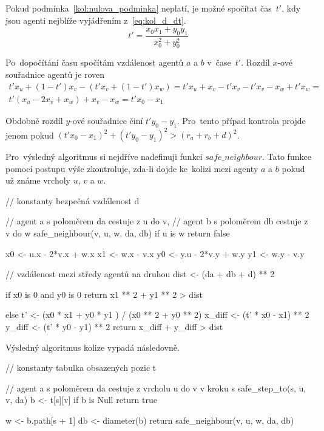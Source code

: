 Pokud podmínka~\ref{kol:nulova_podminka} neplatí, je možné spočítat čas~$t'$, kdy jsou agenti nejblíže vyjádřením z~\ref{eq:kol_d_dt}.
\begin{equation}
  \label{eq:kol_t}
  t' = \frac{x_0 x_1 + y_0 y_1}{x_0^2 + y_0^2}
\end{equation}

Po~dopočítání času spočítám vzdálenost agentů $a$ a $b$ v~čase~$t'$.
Rozdíl $x$-ové souřadnice agentů je roven
\begin{gather*}
  t' x_u + (1 - t')x_v - (t' x_v + (1 - t')x_w) =
  t' x_u + x_v - t' x_v - t' x_v - x_w + t' x_w = \\
  t'(x_u - 2x_v + x_w) + x_v - x_w =
  t' x_0 - x_1
\end{gather*}

Obdobně rozdíl $y$-ové souřadnice činí $t' y_0 - y_1$.
Pro~tento případ kontrola projde jenom pokud $(t' x_0 - x_1)^2 + (t' y_0 - y_1)^2 > (r_a + r_b + d)^2$.

Pro~výsledný algoritmus si nejdříve nadefinuji funkci $safe\_neighbour$.
Tato funkce pomocí postupu výše zkontroluje, zda-li dojde ke~kolizi mezi agenty $a$ a $b$
pokud už známe vrcholy $u$, $v$ a $w$.
\begin{code}
// konstanty bezpečná vzdálenost d

// agent a s poloměrem da cestuje z u do v,
// agent b s poloměrem db cestuje z v do w
safe_neighbour(v, u, w, da, db)
  if u is w return false

  x0 <- u.x - 2*v.x + w.x
  x1 <- w.x - v.x
  y0 <- y.u - 2*v.y + w.y
  y1 <- w.y - v.y

  // vzdálenost mezi středy agentů na druhou
  dist <- (da + db + d) ** 2

  if x0 is 0 and y0 is 0
    return x1 ** 2 + y1 ** 2 > dist

  else
    t' <- (x0 * x1 + y0 * y1 ) / (x0 ** 2 + y0 ** 2)
    x_diff <- (t' * x0 - x1) ** 2
    y_diff <- (t' * y0 - y1) ** 2
    return x_diff + y_diff > dist
\end{code}
\label{alg:check_neighbour}

Výsledný algoritmus kolize vypadá následovně.
\begin{code}
// konstanty tabulka obsazených pozic t

// agent a s poloměrem da cestuje z vrcholu u do v v kroku s
safe_step_to(s, u, v, da)
  b <- t[s][v]
  if b is Null return true

  w <- b.path[s + 1]
  db <- diameter(b)
  return safe_neighbour(v, u, w, da, db)
\end{code}


